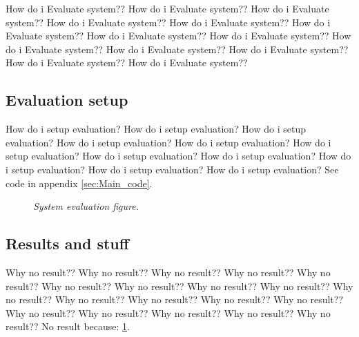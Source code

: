 How do i Evaluate system?? How do i Evaluate system?? How do i Evaluate system?? How do i Evaluate system?? How do i Evaluate system?? How do i Evaluate system?? How do i Evaluate system?? How do i Evaluate system?? How do i Evaluate system?? How do i Evaluate system?? How do i Evaluate system?? How do i Evaluate system?? How do i Evaluate system?? 

\subsection{Evaluation setup}
How do i setup evaluation? How do i setup evaluation? How do i setup evaluation? How do i setup evaluation? How do i setup evaluation? How do i setup evaluation? How do i setup evaluation? How do i setup evaluation? How do i setup evaluation? How do i setup evaluation? How do i setup evaluation? 
See code in appendix \ref{sec:Main_code}. %


\begin{figure}[htb]
	\centering
	\caption{\textit{System evaluation figure.}}
	\label{fig:system_evaluation_fig} %
\end{figure}

\subsection{Results and stuff}
Why no result?? Why no result?? Why no result?? Why no result?? Why no result?? Why no result?? Why no result?? 
Why no result?? Why no result?? Why no result?? Why no result?? Why no result?? Why no result?? Why no result?? Why no result?? Why no result?? 
Why no result?? Why no result?? Why no result?? 
No result because: \ref{fig:system_evaluation_fig}. %



